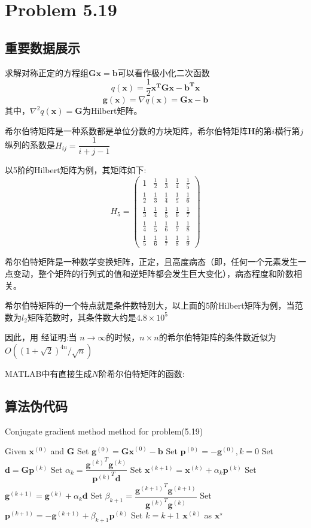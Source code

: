 \newpage
\section{Problem 5.19}
\subsection{重要数据展示}
求解对称正定的方程组$\bm{Gx}=\bm{b}$可以看作极小化二次函数\[q(\bm{x})=\dfrac{1}{2}\bm{x^TGx-b^Tx}\]
\[\bm{g}(\bm{x})=\nabla q(\bm{x})=\bm{Gx}-\bm{b}\]
其中，$\nabla^2 q(\bm{x})=\bm{G}$为Hilbert矩阵。

希尔伯特矩阵是一种系数都是单位分数的方块矩阵，希尔伯特矩阵$\bm{H}$的第$i$横行第$j$纵列的系数是$H_{{ij}}={\dfrac  {1}{i+j-1}}$

以5阶的Hilbert矩阵为例，其矩阵如下:
\[H_5=\left(\begin{array}{ccccc} 1 & \frac{1}{2} & \frac{1}{3} & \frac{1}{4} & \frac{1}{5}\\ \frac{1}{2} & \frac{1}{3} & \frac{1}{4} & \frac{1}{5} & \frac{1}{6}\\ \frac{1}{3} & \frac{1}{4} & \frac{1}{5} & \frac{1}{6} & \frac{1}{7}\\ \frac{1}{4} & \frac{1}{5} & \frac{1}{6} & \frac{1}{7} & \frac{1}{8}\\ \frac{1}{5} & \frac{1}{6} & \frac{1}{7} & \frac{1}{8} & \frac{1}{9} \end{array}\right)\]

希尔伯特矩阵是一种数学变换矩阵，正定，且高度病态（即，任何一个元素发生一点变动，整个矩阵的行列式的值和逆矩阵都会发生巨大变化），病态程度和阶数相关。

希尔伯特矩阵的一个特点就是条件数特别大，以上面的5阶Hilbert矩阵为例，当范数为$l_2$矩阵范数时，其条件数大约是$4.8\times 10^{5}$

因此，用
经证明:当 $ n\rightarrow \infty$的时候，$ n\times n$的希尔伯特矩阵的条件数近似为$O((1+{\sqrt  {2}})^{{4n}}/{\sqrt  {n}})$

MATLAB中有直接生成$N$阶希尔伯特矩阵的函数:

\newpage
\subsection{算法伪代码}
\begin{algorithm}[h]  
\caption{Conjugate gradient method method for problem(5.19)}  
\begin{algorithmic}[1]  
\STATE Given $\bm{x}^{(0)}$  and $\bm{G}$
\STATE Set $\bm{g}^{(0)}=\bm{Gx}^{(0)}-\bm{b}$
\STATE Set $\bm{p}^{(0)}=-\bm{g}^{(0)},k=0$
\STATE Set $\bm{d}=\bm{G}\bm{p}^{(k)}$
\STATE Set $\alpha_k=\dfrac{{\bm{g}^{(k)}}^T\bm{g}^{(k)}}{{\bm{p}^{(k)}}^T\bm{d}}$
\STATE Set $\bm{x}^{(k+1)}=\bm{x}^{(k)}+\alpha_k\bm{p}^{(k)}$
\STATE Set $\bm{g}^{(k+1)}=\bm{g}^{(k)}+\alpha_k\bm{d}$
\STATE Set $\beta_{k+1}=\dfrac{{\bm{g}^{(k+1)}}^T\bm{g}^{(k+1)}}{{\bm{g}^{(k)}}^T{\bm{g}^{(k)}}}$
\STATE Set $\bm{p}^{(k+1)}=-\bm{g}^{(k+1)}+\beta_{k+1}\bm{p}^{(k)}$
\STATE Set $k=k+1$
\ENDWHILE
\RETURN $\bm{x}^{(k)}$ as $\bm{x}^{\star}$
\end{algorithmic}  
\end{algorithm}

